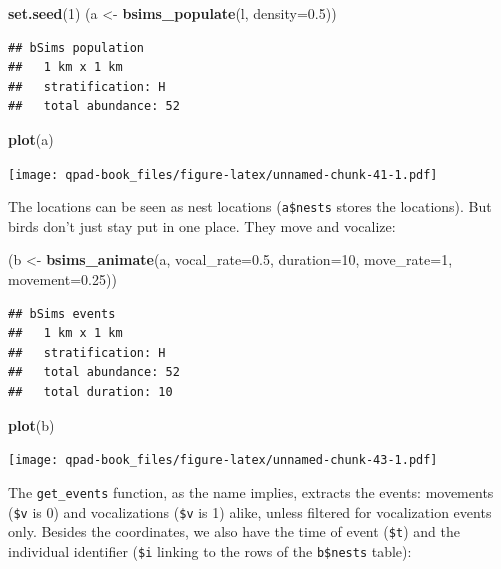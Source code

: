 \documentclass[12pt,]{book}
\newenvironment{Shaded}{\begin{snugshade}}{\end{snugshade}}
\newcommand{\DataTypeTok}[1]{\textcolor[rgb]{0.13,0.29,0.53}{#1}}
\newcommand{\DecValTok}[1]{\textcolor[rgb]{0.00,0.00,0.81}{#1}}
\newcommand{\FloatTok}[1]{\textcolor[rgb]{0.00,0.00,0.81}{#1}}
\newcommand{\KeywordTok}[1]{\textcolor[rgb]{0.13,0.29,0.53}{\textbf{#1}}}
\newcommand{\NormalTok}[1]{#1}
\newcommand{\StringTok}[1]{\textcolor[rgb]{0.31,0.60,0.02}{#1}}
\begin{document}
\begin{Shaded}
\begin{Highlighting}[]
\KeywordTok{set.seed}\NormalTok{(}\DecValTok{1}\NormalTok{)}
\NormalTok{(a <-}\StringTok{ }\KeywordTok{bsims_populate}\NormalTok{(l, }\DataTypeTok{density=}\FloatTok{0.5}\NormalTok{))}
\end{Highlighting}
\end{Shaded}

\begin{verbatim}
## bSims population
##   1 km x 1 km
##   stratification: H
##   total abundance: 52
\end{verbatim}

\begin{Shaded}
\begin{Highlighting}[]
\KeywordTok{plot}\NormalTok{(a)}
\end{Highlighting}
\end{Shaded}

\texttt{[image: qpad-book\_files/figure-latex/unnamed-chunk-41-1.pdf]}

The locations can be seen as nest locations (\texttt{a\$nests} stores the locations).
But birds don't just stay put in one place. They move and vocalize:

\begin{Shaded}
\begin{Highlighting}[]
\NormalTok{(b <-}\StringTok{ }\KeywordTok{bsims_animate}\NormalTok{(a, }
  \DataTypeTok{vocal_rate=}\FloatTok{0.5}\NormalTok{, }\DataTypeTok{duration=}\DecValTok{10}\NormalTok{,}
  \DataTypeTok{move_rate=}\DecValTok{1}\NormalTok{, }\DataTypeTok{movement=}\FloatTok{0.25}\NormalTok{))}
\end{Highlighting}
\end{Shaded}

\begin{verbatim}
## bSims events
##   1 km x 1 km
##   stratification: H
##   total abundance: 52
##   total duration: 10
\end{verbatim}

\begin{Shaded}
\begin{Highlighting}[]
\KeywordTok{plot}\NormalTok{(b)}
\end{Highlighting}
\end{Shaded}

\texttt{[image: qpad-book\_files/figure-latex/unnamed-chunk-43-1.pdf]}

The \texttt{get\_events} function, as the name implies, extracts the events:
movements (\texttt{\$v} is 0) and vocalizations (\texttt{\$v} is 1) alike,
unless filtered for vocalization events only.
Besides the coordinates, we also have the time of event (\texttt{\$t}) and
the individual identifier (\texttt{\$i} linking to the rows of the \texttt{b\$nests} table):
\end{document}

